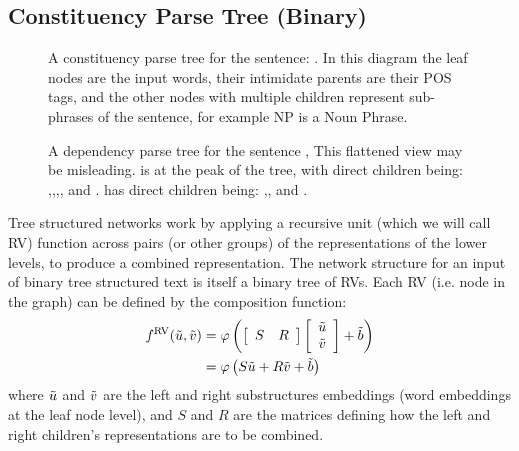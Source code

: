 \documentclass[12pt,parskip]{komatufte}
\begin{document}
\subsection{Constituency Parse Tree (Binary)}

\begin{figure}
	\caption{A constituency parse tree for the sentence: . In this diagram the leaf nodes are the input words, their intimidate parents are their POS tags, and the other nodes with multiple children represent sub-phrases of the sentence, for example NP is a Noun Phrase.}
	\label{fig:consparse}
\end{figure}


\begin{figure}
	\caption{A dependency parse tree for the sentence ,
		This flattened view may be misleading.
		 is at the peak of the tree, with direct children	being:
		,,,,
		and .
		 has direct children being: ,, and .
	}
	\label{fig:depparse}
\end{figure}



Tree structured networks work by applying a recursive unit (which we will call RV) function across pairs (or other groups) of the representations of the lower levels, to produce a combined representation.
The network structure for an input of binary tree structured text is itself a binary tree of RVs.
Each RV (i.e. node in the graph) can be defined by the composition function:
\begin{align}
\d f_{RV}(\v u, \v v) &= \varphi\left(\left[\begin{array}{cc}
S & R\end{array}\right]\left[\begin{array}{c}
\v u\\
\v v
\end{array}\right] + \v b \right) \\ \label{equ:rnn1}
&= \varphi\left( S\v u +R\v v + \v b \right)
\end{align}
where $\tilde{u}$ and $\tilde{v}$ are the left and right substructures embeddings (word embeddings at the leaf node level), and $S$ and $R$ are the matrices defining how the left and right children's representations are to be combined.
\end{document}

